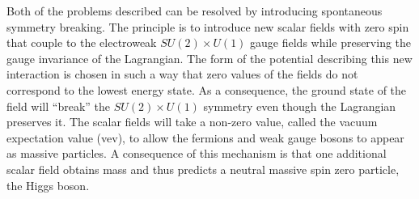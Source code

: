 Both of the problems described can be resolved by introducing 
spontaneous symmetry breaking. The principle is to introduce new scalar fields with 
zero spin that couple to the electroweak  $ SU\left(2\right) \times U\left(1\right) $
gauge fields while preserving the gauge invariance of the Lagrangian.
The form of the potential describing this new interaction is chosen in such a way that 
zero values of the fields do not correspond to the lowest energy state.
As a consequence, the ground state of the field will ``break'' the  
$ SU\left(2\right) \times U\left(1\right) $ symmetry 
even though the Lagrangian preserves it.
The scalar fields will take a non-zero value, called the vacuum expectation value 
(vev), to allow the fermions and weak gauge bosons to appear as massive particles.
A consequence of this mechanism is that one additional scalar field obtains mass
and thus predicts a neutral massive spin zero particle, the Higgs boson. 

